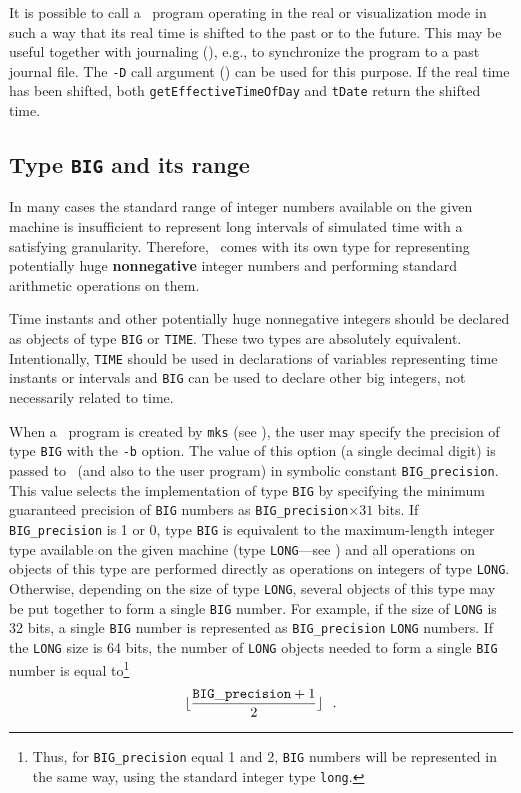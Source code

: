 It is possible to call a \smurph\ program operating in the real or
visualization mode in such a
way that its real time is shifted to the past or to the future.
This may be useful together with journaling (), e.g.,
to synchronize the program to a past journal file.
The {\tt -D} call argument () can be used for this purpose.
If the real time has been shifted, both {\tt getEffectiveTimeOfDay} and
{\tt tDate} return the shifted time.

\subsection {Type {\tt BIG} and its range}
\label {rm_mp_vr}

In many cases the standard range of integer numbers available on the given
machine is insufficient to represent long intervals of simulated time with a
satisfying granularity.
Therefore, \smurph\ comes with its own type for representing potentially
huge {\bf nonnegative} integer numbers and performing standard arithmetic
operations on them.

Time instants and other potentially huge nonnegative integers should be
declared as objects of type {\tt BIG} or {\tt TIME}.
These two types are absolutely equivalent.
Intentionally, {\tt TIME} should be used in declarations of variables
representing time instants or
intervals and {\tt BIG} can be used to declare other big integers, not
necessarily related to time.

When a \smurph\ program is created by {\tt mks} (see ),
the user may specify the precision of type {\tt BIG} with the {\tt -b}
option.
The value of this option (a single decimal digit) is passed
to \smurph\ (and also to the user program) in
symbolic constant {\tt BIG\_precision}.
This value selects the implementation of type {\tt BIG} by specifying the
minimum guaranteed precision of {\tt BIG} numbers as
{\tt BIG\_precision}$\times 31$ bits.
If {\tt BIG\_precision} is 1 or 0,
type {\tt BIG} is equivalent to the maximum-length integer type available on
the given machine (type {\tt LONG}---see )
and all operations on objects of
this type are performed directly as operations on integers of type {\tt LONG}.
Otherwise,
depending on the size of type {\tt LONG}, several objects of this type
may be put together to form a single {\tt BIG} number.
For example, if the size of {\tt LONG} is 32 bits,
a single {\tt BIG} number is represented as {\tt BIG\_precision}
{\tt LONG} numbers.
If the {\tt LONG} size is 64 bits,
the number of {\tt LONG}
objects needed to form a single {\tt BIG} number is equal to\footnote{Thus,
for {\tt BIG\_precision} equal 1 and 2, {\tt BIG} numbers
will be represented in the same way, using the standard integer type {\tt long}.}
\[
\lfloor \frac{{\tt BIG\_precision}+1}{2} \rfloor~~.
\]

